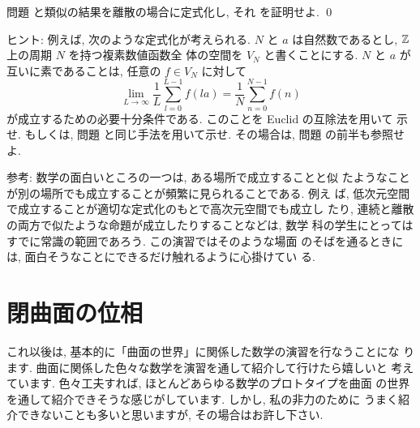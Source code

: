\documentclass[12pt,twoside]{jarticle}
\def\Z{{\Bbb Z}} %
\begin{document}
\begin{question}
  問題  と類似の結果を離散の場合に定式化し, それ
  を証明せよ. \qed
\end{question}

\noindent ヒント: 例えば, 次のような定式化が考えられる. %
$N$ と $a$ は自然数であるとし, $\Z$ 上の周期 $N$ を持つ複素数値函数全
体の空間を $V_N$ と書くことにする. $N$ と $a$ が互いに素であることは, 
任意の $f \in V_N$ に対して
\[
  \lim_{L \to \infty} \frac{1}{L} \sum_{l=0}^{L-1} f(la)
  =
  \frac{1}{N} \sum_{n=0}^{N-1} f(n)
\]%
が成立するための必要十分条件である. このことを Euclid の互除法を用いて
示せ. もしくは, 問題  と同じ手法を用いて示せ. 
その場合は, 問題  の前半も参照せよ.

\noindent 参考: 数学の面白いところの一つは, ある場所で成立することと似
たようなことが別の場所でも成立することが頻繁に見られることである. 例え
ば, 低次元空間で成立することが適切な定式化のもとで高次元空間でも成立し
たり, 連続と離散の両方で似たような命題が成立したりすることなどは, 数学
科の学生にとってはすでに常識の範囲であろう. この演習ではそのような場面
のそばを通るときには, 面白そうなことにできるだけ触れるように心掛けてい
る.



\section{閉曲面の位相}

これ以後は, 基本的に「曲面の世界」に関係した数学の演習を行なうことにな
ります. 曲面に関係した色々な数学を演習を通して紹介して行けたら嬉しいと
考えています. 色々工夫すれば, ほとんどあらゆる数学のプロトタイプを曲面
の世界を通して紹介できそうな感じがしています. しかし, 私の非力のために
うまく紹介できないことも多いと思いますが, その場合はお許し下さい.
\end{document}
